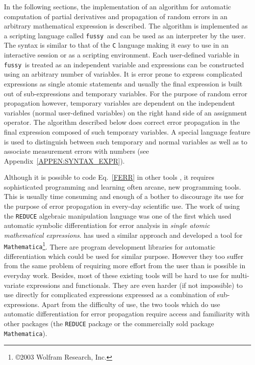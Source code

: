 \documentclass[11pt]{article}
\newcommand{\Fussy}{{\tt fussy}}
\begin{document}
In the following sections, the implementation of an algorithm for
automatic computation of partial derivatives and propagation of random
errors in an arbitrary mathematical expression is described.  The
algorithm is implemented as a scripting language called \Fussy\ and
can be used as an interpreter by the user.  The syntax is similar to
that of the {\tt C} language making it easy to use in an interactive
session or as a scripting environment.  Each user-defined variable in
\Fussy\ is treated as an independent variable and expressions can be
constructed using an arbitrary number of variables.  It is error prone
to express complicated expressions as single atomic statements and
usually the final expression is built out of sub-expressions and
temporary variables.  For the purpose of random error propagation
however, temporary variables are dependent on the independent
variables (normal user-defined variables) on the right hand side of an
assignment operator.  The algorithm described below does correct error
propagation in the final expression composed of such temporary
variables.  A special language feature is used to distinguish between
such temporary and normal variables as well as to associate
measurement errors with numbers (see
Appendix~\ref{APPEN:SYNTAX_EXPR}).

Although it is possible to code Eq.~\ref{FERR} in other tools
\citep{Calc,EDA,Bischof1997A-A}, it requires sophisticated programming
and learning often arcane, new programming tools.  This is usually time
consuming and enough of a bother to discourage its use for the purpose
of error propagation in every-day scientific use.  The work of
\citet{Stoutemyer:1977} using the {\tt REDUCE} algebraic manipulation
language \citep{REDUCE2,REDUCE} was one of the first which used
automatic symbolic differentiation for error analysis in {\it single
  atomic mathematical expressions}.  \citet{EDA} has used a similar
approach and developed a tool for {\tt
  Mathematica}\footnote{\copyright 2003 Wolfram Research, Inc.}.
There are program development libraries
\citep{ScComp,Griewank:1996:AAP,Tsukanov2003Dsa} for automatic
differentiation which could be used for similar purpose.  However they
too suffer from the same problem of requiring more effort from the
user than is possible in everyday work.  Besides, most of these
existing tools will be hard to use for multi-variate expressions and
functionals.  They are even harder (if not impossible) to use directly
for complicated expressions expressed as a combination of
sub-expressions.  Apart from the difficulty of use, the two tools
which do use automatic differentiation for error propagation require
access and familiarity with other packages (the {\tt REDUCE} package
or the commercially sold package {\tt Mathematica}).
\end{document}
